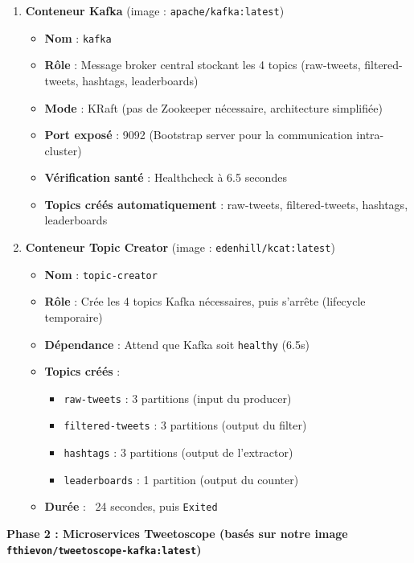 \documentclass[10pt,a4paper]{article}
\begin{document}
\begin{enumerate}
    \item \textbf{Conteneur Kafka} (image : \texttt{apache/kafka:latest})
    \begin{itemize}
        \item \textbf{Nom} : \texttt{kafka}
        \item \textbf{Rôle} : Message broker central stockant les 4 topics (raw-tweets, filtered-tweets, hashtags, leaderboards)
        \item \textbf{Mode} : KRaft (pas de Zookeeper nécessaire, architecture simplifiée)
        \item \textbf{Port exposé} : 9092 (Bootstrap server pour la communication intra-cluster)
        \item \textbf{Vérification santé} : Healthcheck à 6.5 secondes
        \item \textbf{Topics créés automatiquement} : raw-tweets, filtered-tweets, hashtags, leaderboards
    \end{itemize}

    \item \textbf{Conteneur Topic Creator} (image : \texttt{edenhill/kcat:latest})
    \begin{itemize}
        \item \textbf{Nom} : \texttt{topic-creator}
        \item \textbf{Rôle} : Crée les 4 topics Kafka nécessaires, puis s'arrête (lifecycle temporaire)
        \item \textbf{Dépendance} : Attend que Kafka soit \texttt{healthy} (6.5s)
        \item \textbf{Topics créés} :
        \begin{itemize}
            \item \texttt{raw-tweets} : 3 partitions (input du producer)
            \item \texttt{filtered-tweets} : 3 partitions (output du filter)
            \item \texttt{hashtags} : 3 partitions (output de l'extractor)
            \item \texttt{leaderboards} : 1 partition (output du counter)
        \end{itemize}
        \item \textbf{Durée} : ~24 secondes, puis \texttt{Exited}
    \end{itemize}
\end{enumerate}

\textbf{Phase 2 : Microservices Tweetoscope (basés sur notre image \texttt{fthievon/tweetoscope-kafka:latest})}
\end{document}
